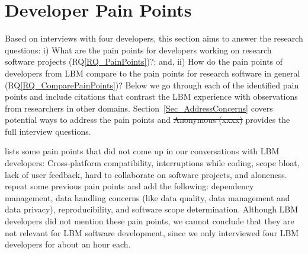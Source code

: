 \documentclass[final, 3p, times, authoryear]{elsarticle}
\newcommand{\rqref}[1]{RQ\ref{#1}}
\providecommand{\DIFdeltex}[1]{{\protect\color{red}\sout{#1}}}                      %
\providecommand{\DIFdelbegin}{} %
\providecommand{\DIFdel}[1]{\texorpdfstring{\DIFdeltex{#1}}{}} %
\begin{document}
\section{Developer Pain Points} \label{painpoints}

Based on interviews with four developers, this section aims to answer the
research questions: i) What are the pain points for developers working on
research software projects (\rqref{RQ_PainPoints})?; and, ii) How do the pain
points of developers from LBM compare to the pain points for research software
in general (\rqref{RQ_ComparePainPoints})?  Below we go through each of the
identified pain points and include citations that contrast the LBM experience
with observations from researchers in other domains.
Section~\ref{Sec_AddressConcerns} covers potential ways to address the pain
points and \DIFdelbegin \DIFdel{Anonymous (xxxx)}
\citet{SmithEtAl2021} provides the full interview questions.

\citet{PintoEtAl2018} lists some pain points that did not come up in our
conversations with LBM developers: Cross-platform compatibility, interruptions
while coding, scope bloat, lack of user feedback, hard to collaborate on
software projects, and aloneness. \citet{WieseEtAl2019} repeat some previous
pain points and add the following: dependency management, data handling concerns
(like data quality, data management and data privacy), reproducibility, and
software scope determination. Although LBM developers did not mention these pain
points, we cannot conclude that they are not relevant for LBM software
development, since we only interviewed four LBM developers for about an hour
each.
\end{document}
